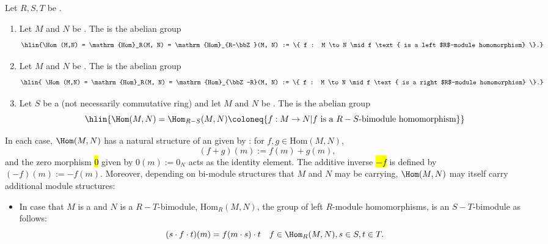 \begin{definition} \label{definition:hom_of_left_right_bi_modules_of_rings}
Let $R,S,T$ be .
\begin{enumerate}
    \item Let $M$ and $N$ be . The  is the abelian group
    $$\hlin{\Hom(M,N) = \mathrm{Hom}_R(M, N) = \mathrm{Hom}_{R-\bbZ}(M, N) := \{ f : M \to N \mid f \text{ is a left $R$-module homomorphism} \}.} $$

    \item Let $M$ and $N$ be . The  is the abelian group
    $$\hlin{ \Hom(M,N) = \mathrm{Hom}_R(M, N) = \mathrm{Hom}_{\bbZ-R}(M, N) := \{ f : M \to N \mid f \text{ is a right $R$-module homomorphism} \}.}$$

    \item Let $S$ be a (not necessarily commutative ring) and let $M$ and $N$ be . The  is the abelian group 
    $$\hlin{\Hom(M,N) = \Hom_{R-S}(M,N) \coloneq \{f: M \to N | f \text{ is a } R-S\text{-bimodule homomorphism} \}}$$
    \end{enumerate}

    In each case, $\Hom(M,N)$ has a natural structure of an  given by : for $f, g \in \mathrm{Hom}(M, N)$,
    $$ (f + g)(m) := f(m) + g(m), $$
    and the zero morphism \hl{$0$} given by $0(m) := 0_N$ acts as the identity element.
    The additive inverse \hl{$-f$} is defined by $(-f)(m) := -f(m)$. Moreover, depending on bi-module structures that $M$ and $N$ may be carrying, $\Hom(M,N)$ may itself carry additional module structures:
    \begin{itemize}
        \item In case that $M$ is a  and $N$ is a $R-T$-bimodule, $\mathrm{Hom}_R(M, N)$, the group of left $R$-module homomorphisms, is an $S-T$-bimodule as follows:
        $$(s\cdot f\cdot t)(m) = f(m \cdot s) \cdot t \quad f \in \Hom_R(M,N), s \in S, t \in T.$$


\end{itemize}
\end{definition}
